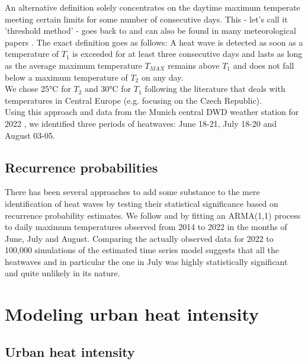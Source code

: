 \documentclass[12pt]{article}
\begin{document}
An alternative definition solely concentrates on the daytime maximum temperate meeting certain limits for some number of consecutive days. This - let's call it 'threshold method' - goes back to \citet{huth2000} and can also be found in many meteorological papers \citep{meehl2004,kysely2004,kysely2010}. The exact definition goes as follows: A heat wave is detected as soon as a temperature of $T_1$ is exceeded for at least three consecutive days and lasts as long as the average maximum temperature $T_{MAX}$ remains above $T_1$ and does not fall below a maximum temperature of $T_2$ on any day. \\
We chose 25°C for $T_2$ and 30°C for $T_1$ following the literature that deals with temperatures in Central Europe (e.g. \citet{kysely2004} focusing on the Czech Republic). \\
Using this approach and data from the Munich central DWD weather station for 2022 , we identified three periods of heatwaves: June 18-21, July 18-20 and August 03-05.

\subsection{Recurrence probabilities}

There has been several approaches to add some substance to the mere identification of heat waves by testing their statistical significance based on recurrence probability estimates. We follow \citet{mearns1984} and \citet{kysely2010} by fitting an ARMA(1,1) process to daily maximum temperatures observed from 2014 to 2022 in the months of June, July and August. Comparing the actually observed data for 2022 to 100,000 simulations of the estimated time series model suggests that all the heatwaves and in particular the one in July was highly statistically significant and quite unlikely in its nature.


\section{Modeling urban heat intensity}

\subsection{Urban heat intensity}
\end{document}
